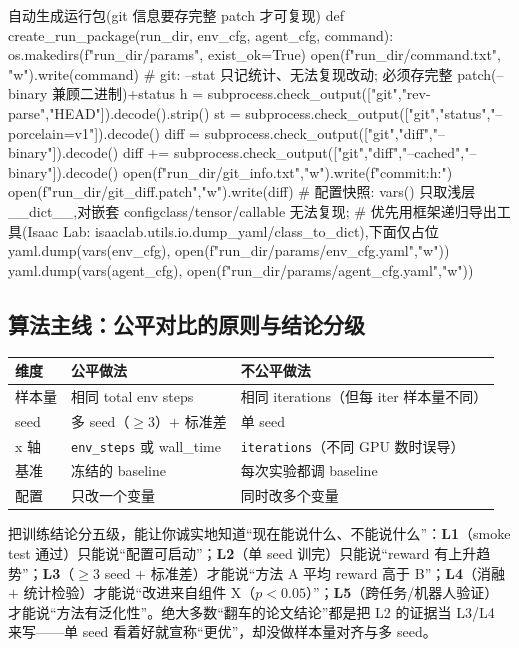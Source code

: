 \begin{codebox}[Python]{自动生成运行包(git 信息要存完整 patch 才可复现)}
def create_run_package(run_dir, env_cfg, agent_cfg, command):
    os.makedirs(f"{run_dir}/params", exist_ok=True)
    open(f"{run_dir}/command.txt", "w").write(command)
    # git: --stat 只记统计、无法复现改动; 必须存完整 patch(--binary 兼顾二进制)+status
    h = subprocess.check_output(["git","rev-parse","HEAD"]).decode().strip()
    st = subprocess.check_output(["git","status","--porcelain=v1"]).decode()
    diff = subprocess.check_output(["git","diff","--binary"]).decode()
    diff += subprocess.check_output(["git","diff","--cached","--binary"]).decode()
    open(f"{run_dir}/git_info.txt","w").write(f"commit:{h}\nstatus:")
    open(f"{run_dir}/git_diff.patch","w").write(diff)
    # 配置快照: vars() 只取浅层 __dict__,对嵌套 configclass/tensor/callable 无法复现;
    # 优先用框架递归导出工具(Isaac Lab: isaaclab.utils.io.dump_yaml/class_to_dict),下面仅占位
    yaml.dump(vars(env_cfg),   open(f"{run_dir}/params/env_cfg.yaml","w"))
    yaml.dump(vars(agent_cfg), open(f"{run_dir}/params/agent_cfg.yaml","w"))
\end{codebox}

\subsection{算法主线：公平对比的原则与结论分级}
\label{sec:rlmc-ls-fair}

\begin{center}
\small
\begin{tabular}{@{}p{2.0cm}p{4.6cm}p{5.0cm}@{}}
\toprule
维度 & 公平做法 & 不公平做法 \\
\midrule
样本量 & 相同 total env steps & 相同 iterations（但每 iter 样本量不同） \\
seed & 多 seed（$\ge 3$）$+$ 标准差 & 单 seed \\
x 轴 & \verb|env_steps| 或 wall\_time & \verb|iterations|（不同 GPU 数时误导） \\
基准 & 冻结的 baseline & 每次实验都调 baseline \\
配置 & 只改一个变量 & 同时改多个变量 \\
\bottomrule
\end{tabular}
\end{center}

\begin{insight}\label{ins:rlmc-ls-levels}
把训练结论分五级，能让你诚实地知道“现在能说什么、不能说什么”：\textbf{L1}（smoke test 通过）只能说“配置可启动”；\textbf{L2}（单 seed 训完）只能说“reward 有上升趋势”；\textbf{L3}（$\ge 3$ seed $+$ 标准差）才能说“方法 A 平均 reward 高于 B”；\textbf{L4}（消融 $+$ 统计检验）才能说“改进来自组件 X（$p<0.05$）”；\textbf{L5}（跨任务/机器人验证）才能说“方法有泛化性”。绝大多数“翻车的论文结论”都是把 L2 的证据当 L3/L4 来写——单 seed 看着好就宣称“更优”，却没做样本量对齐与多 seed。
\end{insight}

